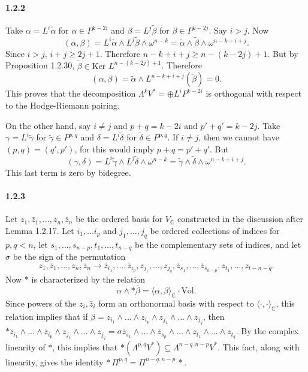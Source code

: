 \documentclass[10pt,letter]{article}
\begin{document}
\paragraph*{1.2.2} Take $\alpha = L^i \tilde{\alpha}$ for $\alpha \in P^{k-2i}$ and $\beta = L^j \tilde{\beta}$ for $\beta \in P^{k-2j}$. Say $i > j$. Now
\[ (\alpha,\beta) =  L^i \tilde{\alpha} \wedge L^j \tilde{\beta} \wedge \omega^{n-k} = \tilde{\alpha} \wedge \tilde{\beta} \wedge \omega^{n-k+i+j}.\]
Since $i > j$, $i + j \geq 2j + 1$. Therefore $n-k+i+j \geq n-(k-2j)+1$. But by Proposition 1.2.30, $\tilde{\beta} \in \text{Ker }L^{n-(k-2j)+1}$. Therefore 
\[ (\alpha,\beta) = \tilde{\alpha} \wedge L^{n-k+i+j}(\tilde{\beta}) = 0.\] This proves that the decomposition $\Lambda^k V^{\ast} = \oplus L^i P^{k-2i}$ is orthogonal with respect to the Hodge-Riemann pairing.

On the other hand, say $i \neq j$ and $p+q = k- 2i$ and $p' +q' = k-2j$. Take $\gamma = L^i \tilde{\gamma}$ for $\tilde{\gamma} \in P^{p,q}$ and $\delta = L^i \tilde{\delta}$ for $\tilde{\delta} \in P^{p,q}$. If $i \neq j$, then we cannot have $(p,q) = (q',p')$, for this would imply $p+q = p'+q'$. But 
\[ (\gamma,\delta) = L^i\tilde{\gamma} \wedge L^j \tilde{\delta} \wedge \omega^{n-k} = \tilde{\gamma} \wedge \tilde{\delta} \wedge \omega^{n-k+i+j}.\]
This last term is zero by bidegree. 

\paragraph*{1.2.3} Let $z_1,\bar{z}_1,...,z_n,\bar{z}_n$ be the ordered basis for $V_{\mathbb{C}}$ constructed in the discussion after Lemma 1.2.17. Let $i_1,...i_p$ and $j_1,...,j_q$ be ordered collections of indices for $p,q < n$, let $s_1,...,s_{n-p},t_1,...,t_{n-q}$ be the complementary sets of indices, and let $\sigma$ be the sign of the permutation
\[ z_1,\bar{z}_1,...,z_n,\bar{z}_n \rightarrow \bar{z}_{i_1},...,\bar{z}_{i_p},z_{j_1},...,z_{j_q},\bar{z}_{s_1},  ...  , \bar{z}_{s_{n-p}} , z_{t_1} , ... ,z_{t-{n-q}}.\]  Now $\ast$ is characterized by the relation \[ \alpha \wedge \ast \bar{\beta} = \langle \alpha, \beta \rangle_{\mathbb{C}} \cdot \text{Vol}. \] 
Since powers of the $z_i, \bar{z}_i$ form an orthonormal basis with respect to $\langle \cdot , \cdot \rangle_{\mathbb{C}}$, this relation implies that if $\beta = z_{i_1} \wedge ... \wedge z_{i_p} \wedge z_{j_1} \wedge ... \wedge z_{j_q}$, then $\ast \bar{z}_{i_1} \wedge ... \wedge \bar{z}_{i_p} \wedge z_{j_1} \wedge ... \wedge z_{j_q} = \sigma \bar{z}_{s_1} \wedge ... \wedge \bar{z}_{s_p} \wedge ... \wedge z_{t_1} \wedge ... \wedge z_{t_q}.$ By the complex linearity of $\ast$, this implies that $\ast(\Lambda^{p,q}V^{\ast}) \subseteq \Lambda^{n-q,n-p}V^{\ast}$. This fact, along with linearity, gives the identity $\ast \, \Pi^{p,q} = \Pi^{n-q,n-p} \, \ast.$ 
\end{document}
